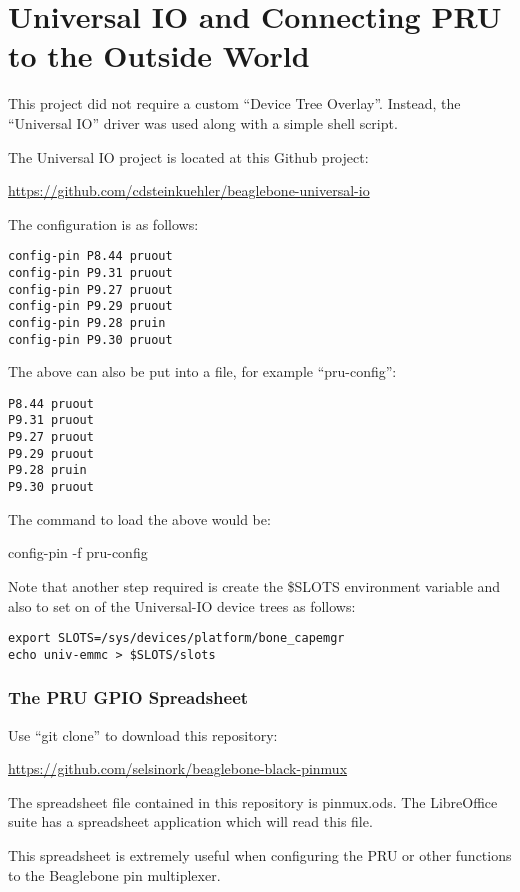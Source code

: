 \chapter{Universal IO and Connecting PRU to the Outside World}

This project did not require a custom ``Device Tree Overlay''.  Instead, the ``Universal IO'' driver was used along with a simple shell script.

The Universal IO project is located at this Github project:

\url{https://github.com/cdsteinkuehler/beaglebone-universal-io}

The configuration is as follows:

\begin{verbatim}
config-pin P8.44 pruout
config-pin P9.31 pruout
config-pin P9.27 pruout
config-pin P9.29 pruout
config-pin P9.28 pruin
config-pin P9.30 pruout
\end{verbatim}

The above can also be put into a file, for example ``pru-config'':

\begin{verbatim}
P8.44 pruout
P9.31 pruout
P9.27 pruout
P9.29 pruout
P9.28 pruin
P9.30 pruout
\end{verbatim}

The command to load the above would be:

config-pin -f pru-config

Note that another step required is create the \$SLOTS environment variable
and also to set on of the Universal-IO device trees as follows:

\begin{verbatim}
export SLOTS=/sys/devices/platform/bone_capemgr
echo univ-emmc > $SLOTS/slots 
\end{verbatim}


\subsection{The PRU GPIO Spreadsheet}

Use ``git clone'' to download this repository:

\url{https://github.com/selsinork/beaglebone-black-pinmux}

The spreadsheet file contained in this repository is pinmux.ods.
The LibreOffice suite has a spreadsheet application which will read
this file.

This spreadsheet is extremely useful when configuring the PRU or
other functions to the Beaglebone pin multiplexer.



